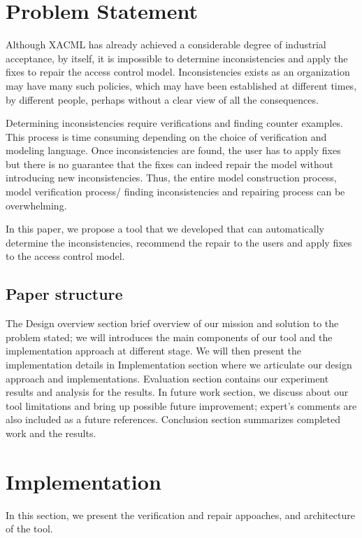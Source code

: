 \documentclass{acm_proc_article-sp}
\begin{document}
\section{Problem Statement}

Although XACML has already achieved a considerable degree of industrial acceptance, by itself, it is impossible to determine inconsistencies and apply the fixes to repair the access control model. Inconsistencies exists as an organization may have many such policies, which may have been established at different times, by different people, perhaps without a clear view of all the consequences. 

Determining inconsistencies require verifications and finding counter examples. This process is time consuming depending on the choice of verification and modeling language. Once inconsistencies are found, the user has to apply fixes but there is no guarantee that the fixes can indeed repair the model without introducing new inconsistencies. Thus, the entire model construction process, model verification process/ finding inconsistencies and repairing process can be overwhelming.

In this paper, we propose a tool that we developed that can automatically determine the inconsistencies, recommend the repair to the users and apply fixes to the access control model.

\subsection{Paper structure}
The Design overview section brief overview of our mission and solution to the problem stated; we will introduces the main components of our tool and the implementation approach at different stage. We will then present the implementation details in Implementation section where we articulate our design approach and implementations. Evaluation section contains our experiment results and analysis for the results. In future work section, we discuss about our tool limitations and bring up possible future improvement; expert's comments are also included as a future references. Conclusion section summarizes completed work and the results.

\section{Implementation}

In this section, we present the verification and repair appoaches, and architecture of the tool.
\end{document}
